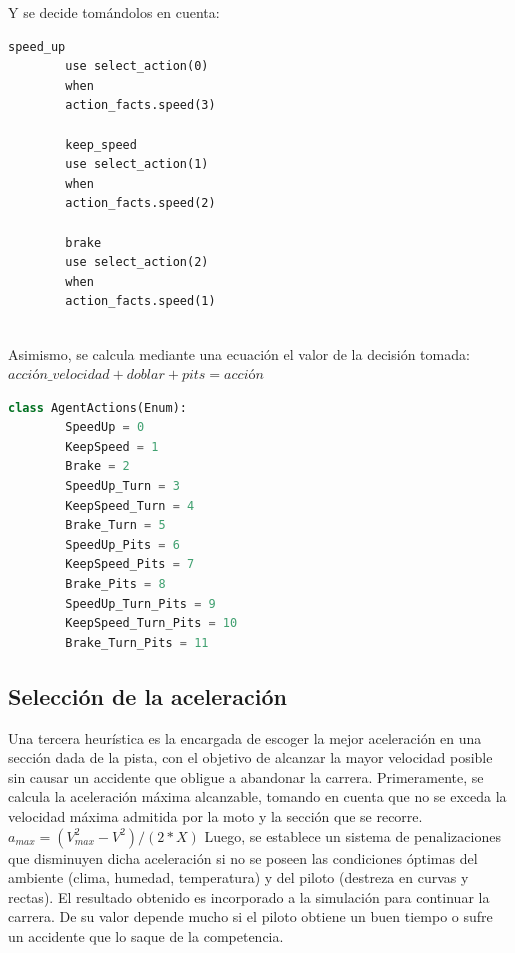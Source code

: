 \documentclass[12pt, letterpaper,spanish]{article}
\theoremstyle{definition}
\theoremstyle{remark}
\begin{document}
	Y se decide tomándolos en cuenta:
	\begin{lstlisting}[language={PySharp}, label={Script}]
		speed_up
		use select_action(0)
		when
		action_facts.speed(3)
		
		keep_speed
		use select_action(1)
		when
		action_facts.speed(2)
		
		brake
		use select_action(2)
		when
		action_facts.speed(1)
		
	\end{lstlisting}
	
	Asimismo, se calcula mediante una ecuación el valor de la decisión tomada:
	$acción\_velocidad + doblar + pits = acción$
	
	\begin{lstlisting}[language={Python}, label={Script}]
		class AgentActions(Enum):
		SpeedUp = 0
		KeepSpeed = 1
		Brake = 2
		SpeedUp_Turn = 3
		KeepSpeed_Turn = 4
		Brake_Turn = 5
		SpeedUp_Pits = 6
		KeepSpeed_Pits = 7
		Brake_Pits = 8
		SpeedUp_Turn_Pits = 9
		KeepSpeed_Turn_Pits = 10
		Brake_Turn_Pits = 11
	\end{lstlisting}
	
	\subsection{Selección de la aceleración}
	Una tercera heurística es la encargada de escoger la mejor aceleración en una sección dada de la pista, con el objetivo de alcanzar la mayor velocidad posible sin causar un accidente que obligue a abandonar la carrera. 
	Primeramente, se calcula la aceleración máxima alcanzable, tomando en cuenta que no se exceda la velocidad máxima admitida por la moto y la sección que se recorre.
	$a_{max}=(V_{max}^{2}-V^{2})/(2*X)$
	Luego, se establece un sistema de penalizaciones que disminuyen dicha aceleración si no se poseen las condiciones óptimas del ambiente (clima, humedad, temperatura) y del piloto (destreza en curvas y rectas).
	El resultado obtenido es incorporado a la simulación para continuar la carrera. De su valor depende mucho si el piloto obtiene un buen tiempo o sufre un accidente que lo saque de la competencia.
	
\pagebreak


\end{document}
